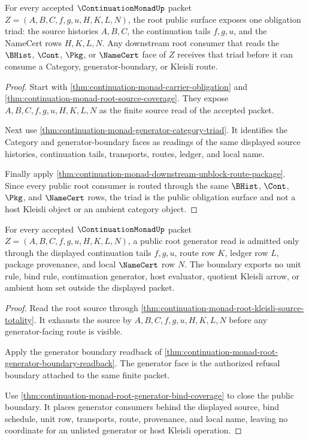 \begin{theorem}
\label{thm:continuation-monad-root-public-obligation-triad}
For every accepted $\ContinuationMonadUp$ packet
$Z=(A,B,C,f,g,u,H,K,L,N)$, the root public surface exposes one obligation
triad: the source histories $A,B,C$, the continuation tails $f,g,u$, and the
NameCert rows $H,K,L,N$. Any downstream root consumer that reads the
$\BHist$, $\Cont$, $\Pkg$, or $\NameCert$ face of $Z$ receives that triad
before it can consume a Category, generator-boundary, or Kleisli route.
\end{theorem}
\begin{proof}
Start with \autoref{thm:continuation-monad-carrier-obligation} and
\autoref{thm:continuation-monad-root-source-coverage}. They expose
$A,B,C,f,g,u,H,K,L,N$ as the finite source read of the accepted packet.

Next use \autoref{thm:continuation-monad-generator-category-triad}. It
identifies the Category and generator-boundary faces as readings of the same
displayed source histories, continuation tails, transports, routes, ledger,
and local name.

Finally apply
\autoref{thm:continuation-monad-downstream-unblock-route-package}. Since
every public root consumer is routed through the same $\BHist$, $\Cont$,
$\Pkg$, and $\NameCert$ rows, the triad is the public obligation surface and
not a host Kleisli object or an ambient category object.
\end{proof}

\begin{theorem}
\label{thm:continuation-monad-root-public-generator-boundary}
For every accepted $\ContinuationMonadUp$ packet
$Z=(A,B,C,f,g,u,H,K,L,N)$, a public root generator read is admitted only
through the displayed continuation tails $f,g,u$, route row $K$, ledger row
$L$, package provenance, and local $\NameCert$ row $N$. The boundary exports
no unit rule, bind rule, continuation generator, host evaluator, quotient
Kleisli arrow, or ambient hom set outside the displayed packet.
\end{theorem}
\begin{proof}
Read the root source through
\autoref{thm:continuation-monad-root-kleisli-source-totality}. It exhausts
the source by $A,B,C,f,g,u,H,K,L,N$ before any generator-facing route is
visible.

Apply the generator boundary readback of
\autoref{thm:continuation-monad-root-generator-boundary-readback}. The
generator face is the authorized refusal boundary attached to the same
finite packet.

Use \autoref{thm:continuation-monad-root-generator-bind-coverage} to close
the public boundary. It places generator consumers behind the displayed
source, bind schedule, unit row, transports, route, provenance, and local
name, leaving no coordinate for an unlisted generator or host Kleisli
operation.
\end{proof}


